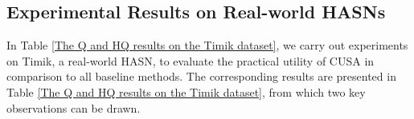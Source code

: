 \begingroup
\renewcommand{\arraystretch}{1}
\begin{table}[t]
\centering
\caption{The Q and HQ results on the real-world dataset (Timik) \cite{chen2022user}, obtained by CUSA in comparison to that of four clustering baselines each equipped with no removal of AIs (N), all removal of AIs (A), and removal of AIs by GAD (D).}
\label{The Q and HQ results on the Timik dataset}
\small
{}
\end{table}
\endgroup


\subsection{Experimental Results on Real-world HASNs}
In Table \ref{The Q and HQ results on the Timik dataset}, we carry out experiments on Timik, a real-world HASN, to evaluate the practical utility of CUSA in comparison to all baseline methods. The corresponding results are presented in Table \ref{The Q and HQ results on the Timik dataset}, from which two key observations can be drawn. 

